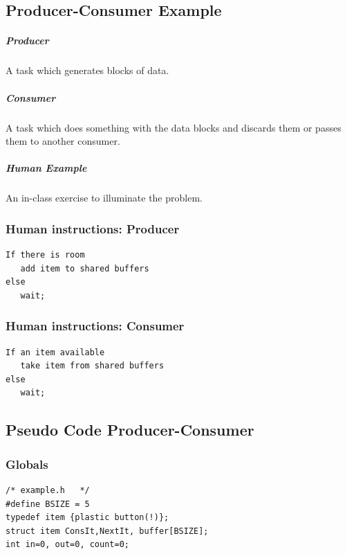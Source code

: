 

\subsection{Producer-Consumer Example}

\subparagraph{Producer} A task which generates blocks of data.

\subparagraph{Consumer} A task which does something with the data
blocks and discards them or passes them to another consumer.

\subparagraph{Human Example}   An in-class exercise to illuminate
the problem.



\subsubsection{Human instructions: Producer }
\begin{verbatim}
If there is room
   add item to shared buffers
else
   wait;
\end{verbatim}


\subsubsection{Human instructions: Consumer }
\begin{verbatim}
If an item available
   take item from shared buffers
else
   wait;
\end{verbatim}




\subsection{Pseudo Code Producer-Consumer}
\subsubsection{ Globals }
\begin{verbatim}
/* example.h   */
#define BSIZE = 5
typedef item {plastic button(!)};
struct item ConsIt,NextIt, buffer[BSIZE];
int in=0, out=0, count=0;
\end{verbatim}

